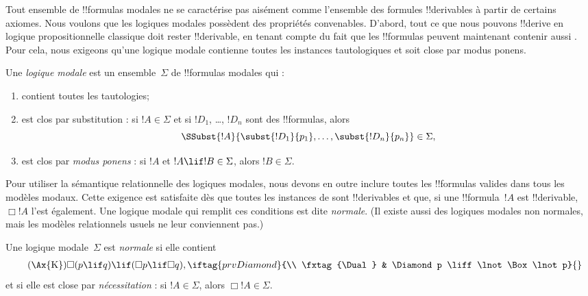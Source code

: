 \documentclass[../../../include/open-logic-section]{subfiles}
\begin{document}


Tout ensemble de !!{formula}s modales ne se caractérise pas aisément
comme l'ensemble des formules !!{derivable}s à partir de certains
axiomes. Nous voulons que les logiques modales possèdent des
propriétés convenables. D'abord, tout ce que nous pouvons !!{derive}
en logique propositionnelle classique doit rester !!{derivable}, en
tenant compte du fait que les !!{formula}s peuvent maintenant
contenir aussi . Pour cela, nous
exigeons qu'une logique modale contienne toutes les instances
tautologiques et soit close par modus ponens.

\begin{defn}
  Une \emph{logique modale} est un ensemble~$\Sigma$ de
  !!{formula}s modales qui :
  \begin{enumerate}
  \item contient toutes les tautologies;
  \item est clos par substitution : si $!A \in \Sigma$ et si
    $!D_1$, \dots, $!D_n$ sont des !!{formula}s, alors
    \[
    \SSubst{!A}{\subst{!D_1}{p_1}, \dots, \subst{!D_n}{p_n}} \in \Sigma,
    \]
    \item est clos par \emph{modus ponens} : si $!A$ et $!A
      \lif !B \in \Sigma$, alors $!B \in \Sigma$.
  \end{enumerate}
\end{defn}

Pour utiliser la sémantique relationnelle des logiques modales, nous
devons en outre inclure toutes les !!{formula}s valides dans tous les
modèles modaux. Cette exigence est satisfaite dès que toutes les
instances de  sont
!!{derivable}s et que, si une !!{formula}~$!A$ est !!{derivable},
$\Box !A$ l'est également. Une logique modale qui remplit ces
conditions est dite \emph{normale}. (Il existe aussi des logiques
modales non normales, mais les modèles relationnels usuels ne leur
conviennent pas.)

\begin{defn}
  Une logique modale~$\Sigma$ est \emph{normale} si elle contient
  \begin{align*}
    \tag{\Ax{K}} & \Box(p \lif q) \lif (\Box p \lif \Box q),
    \iftag{prvDiamond}{\\
      \tag{\Dual} & \Diamond p \liff \lnot\Box\lnot p}{}
  \end{align*}
  et si elle est close par \emph{nécessitation} : si
  $!A \in \Sigma$, alors $\Box !A \in \Sigma$.
\end{defn}
\end{document}
